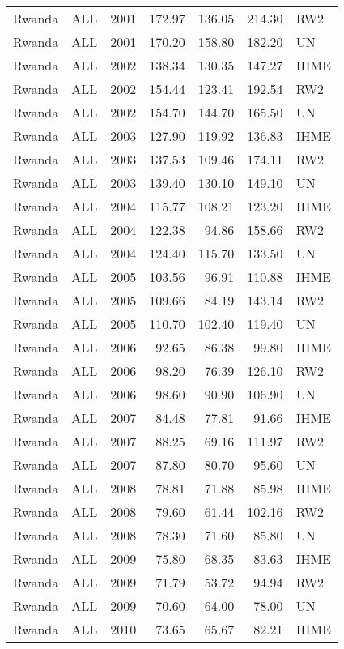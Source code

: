 \begin{longtable}{lllrrrl}
  Rwanda & ALL & 2001 & 172.97 & 136.05 & 214.30 & RW2 \\ 
  Rwanda & ALL & 2001 & 170.20 & 158.80 & 182.20 & UN \\ 
  Rwanda & ALL & 2002 & 138.34 & 130.35 & 147.27 & IHME \\ 
  Rwanda & ALL & 2002 & 154.44 & 123.41 & 192.54 & RW2 \\ 
  Rwanda & ALL & 2002 & 154.70 & 144.70 & 165.50 & UN \\ 
  Rwanda & ALL & 2003 & 127.90 & 119.92 & 136.83 & IHME \\ 
  Rwanda & ALL & 2003 & 137.53 & 109.46 & 174.11 & RW2 \\ 
  Rwanda & ALL & 2003 & 139.40 & 130.10 & 149.10 & UN \\ 
  Rwanda & ALL & 2004 & 115.77 & 108.21 & 123.20 & IHME \\ 
  Rwanda & ALL & 2004 & 122.38 & 94.86 & 158.66 & RW2 \\ 
  Rwanda & ALL & 2004 & 124.40 & 115.70 & 133.50 & UN \\ 
  Rwanda & ALL & 2005 & 103.56 & 96.91 & 110.88 & IHME \\ 
  Rwanda & ALL & 2005 & 109.66 & 84.19 & 143.14 & RW2 \\ 
  Rwanda & ALL & 2005 & 110.70 & 102.40 & 119.40 & UN \\ 
  Rwanda & ALL & 2006 & 92.65 & 86.38 & 99.80 & IHME \\ 
  Rwanda & ALL & 2006 & 98.20 & 76.39 & 126.10 & RW2 \\ 
  Rwanda & ALL & 2006 & 98.60 & 90.90 & 106.90 & UN \\ 
  Rwanda & ALL & 2007 & 84.48 & 77.81 & 91.66 & IHME \\ 
  Rwanda & ALL & 2007 & 88.25 & 69.16 & 111.97 & RW2 \\ 
  Rwanda & ALL & 2007 & 87.80 & 80.70 & 95.60 & UN \\ 
  Rwanda & ALL & 2008 & 78.81 & 71.88 & 85.98 & IHME \\ 
  Rwanda & ALL & 2008 & 79.60 & 61.44 & 102.16 & RW2 \\ 
  Rwanda & ALL & 2008 & 78.30 & 71.60 & 85.80 & UN \\ 
  Rwanda & ALL & 2009 & 75.80 & 68.35 & 83.63 & IHME \\ 
  Rwanda & ALL & 2009 & 71.79 & 53.72 & 94.94 & RW2 \\ 
  Rwanda & ALL & 2009 & 70.60 & 64.00 & 78.00 & UN \\ 
  Rwanda & ALL & 2010 & 73.65 & 65.67 & 82.21 & IHME \\ 

\end{longtable}
